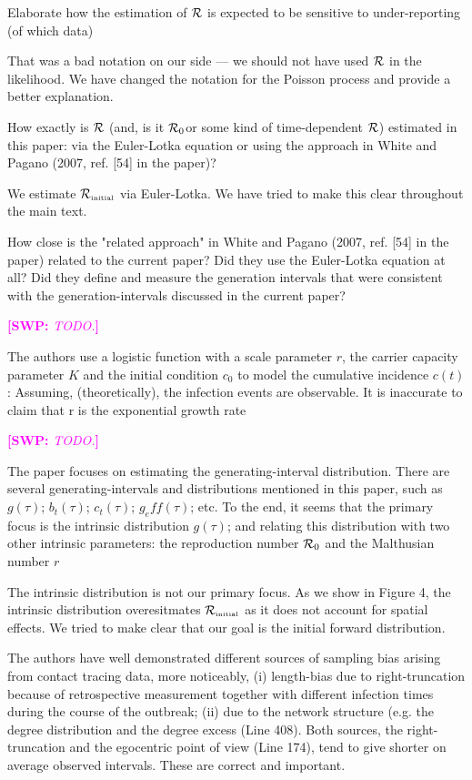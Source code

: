 \documentclass[12pt]{article}
\newcommand{\RR}{\ensuremath{{\cal R}}}
\newcommand{\Rx}[1]{\ensuremath{{\cal R}_{#1}}}
\newcommand{\Ro}{\Rx{0}}
\newcommand{\Rini}{\Rx{\textrm{\tiny initial}}}
\newcommand{\revtext}{\textsf}
\newcommand{\comment}[3]{\textcolor{#1}{\textbf{[#2: }\textsl{#3}\textbf{]}}}
\newcommand{\swp}[1]{\comment{magenta}{SWP}{#1}}
\begin{document}
\revtext{
Elaborate how the estimation of $\RR$ is expected to be sensitive to under-reporting (of which data)
}

That was a bad notation on our side --- we should not have used $\RR$ in the likelihood. 
We have changed the notation for the Poisson process and provide a better explanation.

\revtext{
How exactly is $\RR$ (and, is it \Ro or some kind of time-dependent \RR) estimated in this paper: via the Euler-Lotka equation or using the approach in White and Pagano (2007, ref. [54] in the paper)?
}

We estimate $\Rini$ via Euler-Lotka. We have tried to make this clear throughout the main text.

\revtext{
How close is the "related approach" in White and Pagano
(2007, ref. [54] in the paper) related to the current paper? Did they use the
Euler-Lotka equation at all? Did they define and measure the generation intervals that were consistent with the generation-intervals discussed in
the current paper?
}

\swp{TODO.}

\revtext{
The authors use a logistic function with a scale parameter $r$,
the carrier capacity parameter $K$ and the initial condition $c_0$ to model the
cumulative incidence $c(t)$: Assuming, (theoretically), the infection events
are observable. It is inaccurate to claim that r is the exponential growth
rate
}

\swp{TODO.}

\revtext{
The paper focuses on estimating the generating-interval distribution. There are
several generating-intervals and distributions mentioned in this paper, such as
$g(\tau)$; $b_t(\tau)$; $c_t(\tau)$; $g_eff(\tau)$; etc. To the end, it seems that the primary focus is the
intrinsic distribution $g(\tau)$; and relating this distribution with two other intrinsic
parameters: the reproduction number $\Ro$ and the Malthusian number $r$
}

The intrinsic distribution is not our primary focus. 
As we show in Figure 4, the intrinsic distribution overesitmates $\Rini$ as it does not account for spatial effects.
We tried to make clear that our goal is the initial forward distribution.

\revtext{
The authors have well demonstrated different sources of sampling bias
arising from contact tracing data, more noticeably, (i) length-bias due
to right-truncation because of retrospective measurement together with
different infection times during the course of the outbreak; (ii) due to the
network structure (e.g. the degree distribution and the degree excess (Line
408). Both sources, the right-truncation and the egocentric point of view
(Line 174), tend to give shorter on average observed intervals. These are
correct and important.
}
\end{document}
